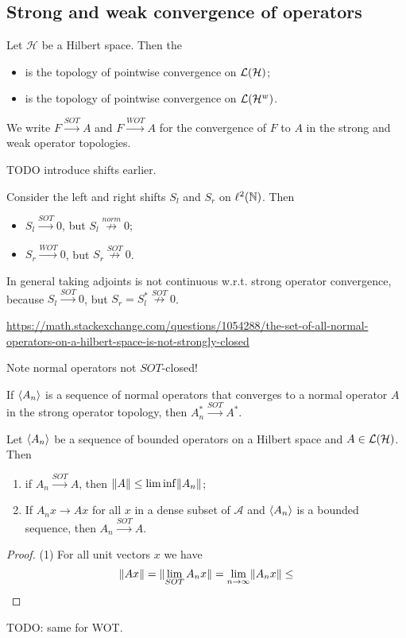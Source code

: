 \subsection{Strong and weak convergence of operators}
\begin{definition}
Let $\mathcal{H}$ be a Hilbert space. Then the
\begin{itemize}
\item {} is the topology of pointwise convergence on $\operatorname{\mathcal{L}}(\mathcal{H})$;
\item {} is the topology of pointwise convergence on $\operatorname{\mathcal{L}}(\mathcal{H}^w)$.
\end{itemize}
We write $F \overset{SOT}{\longrightarrow}A$ and $F \overset{WOT}{\longrightarrow}A$ for the convergence of $F$ to $A$ in the strong and weak operator topologies.
\end{definition}


TODO introduce shifts earlier.
\begin{example}
Consider the left and right shifts $S_l$ and $S_r$ on $\ell^2(\mathbb{N})$. Then
\begin{itemize}
\item $S_l \overset{SOT}{\longrightarrow} 0$, but $S_l \overset{norm}{\not\longrightarrow} 0$;
\item $S_r \overset{WOT}{\longrightarrow} 0$, but $S_r \overset{SOT}{\not\longrightarrow} 0$.
\end{itemize}
In general taking adjoints is not continuous w.r.t. strong operator convergence, because $S_l \overset{SOT}{\longrightarrow} 0$, but $S_r = S_l^* \overset{SOT}{\not\longrightarrow} 0$.
\end{example}

\url{https://math.stackexchange.com/questions/1054288/the-set-of-all-normal-operators-on-a-hilbert-space-is-not-strongly-closed}


Note normal operators not $SOT$-closed!
\begin{proposition}
If $\left\langle A_n \right\rangle$ is a sequence of normal operators that converges to a normal operator $A$ in the strong operator topology, then $A_n^* \overset{SOT}{\longrightarrow} A^*$.
\end{proposition}

\begin{proposition}
Let $\left\langle A_n \right\rangle$ be a sequence of bounded operators on a Hilbert space and $A\in\operatorname{\mathcal{L}}(\mathcal{H})$. Then
\begin{enumerate}
\item if $A_n \overset{SOT}{\longrightarrow} A$, then $\lVert A\rVert\leq \liminf\lVert A_n\rVert$;
\item If $A_nx \longrightarrow Ax$ for all $x$ in a dense subset of $\mathcal{A}$ and $\left\langle A_n \right\rangle$ is a bounded sequence, then $A_n \overset{SOT}{\longrightarrow} A$.
\end{enumerate}
\end{proposition}
\begin{proof}
(1) For all unit vectors $x$ we have
\[ \lVert Ax\rVert = \lVert\lim_{SOT}A_nx\rVert = \lim_{n\to\infty}\lVert A_nx\rVert \leq  \]
\end{proof}
TODO: same for WOT.


